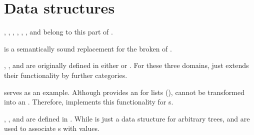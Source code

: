 %                                                                        
%                                                                        
%                                                                        
%                                                                        
%
\clearpage
\section{Data structures}

,
,
,
,
,
, and 
belong to this part of \projectname.

 is a semantically sound replacement for the broken  of \LibAldor.

,
, and  are originally defined in either \LibAldor or \LibAlgebra. For these three domains, \projectname just extends their functionality by further categories.

 serves as an example. Although \LibAlgebra provides an  for lists (),  cannot be transformed into an . Therefore, \projectname implements this functionality for s.


,
, and 
 are defined in \projectname. While  is just a data structure for arbitrary trees,  and  are used to associate s with values.



